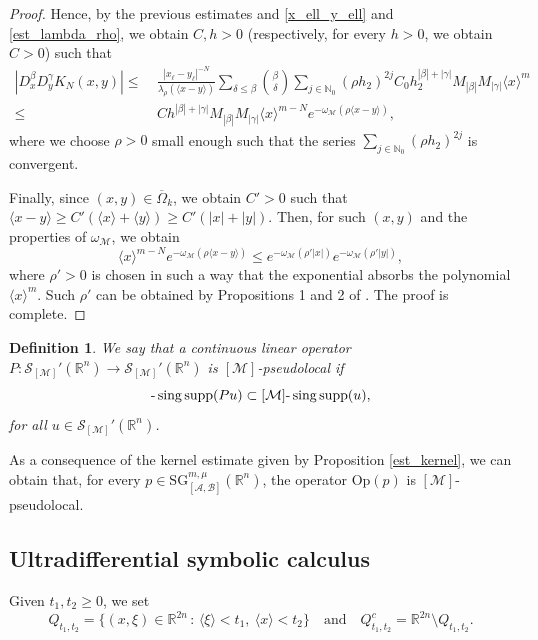 \documentclass[11pt,reqno]{amsart}
\numberwithin{equation}{section}
\newtheorem{definition}[theorem]{Definition}
\newcommand{\R}{{\mathbb{R}}} %
\newcommand{\N}{{\mathbb{N}}} %
\newcommand{\caS}{{\mathcal{S}}}
\newcommand{\SG}{{\mathrm{SG}}}
\newcommand{\M}{{\mathcal{M}}} %
\newcommand{\A}{{\mathcal{A}}} %
\newcommand{\B}{{\mathcal{B}}} %
\begin{document}
\begin{proof}
	Hence, by the previous estimates and \eqref{x_ell_y_ell} and \eqref{est_lambda_rho},  we obtain $C,h>0$ (respectively, for every $h>0$, we obtain $C>0$) such that
	\begin{align*}
		|D_x^\beta D_y^\gamma K_N(x,y)| \leq\ & \frac{|x_\ell-y_\ell|^{-N}}{\lambda_\rho(\langle x-y\rangle)}\sum_{\delta\leq\beta}\binom{\beta}{\delta}\sum_{j\in\N_0}(\rho h_2)^{2j} C_0h_2^{|\beta|+|\gamma|}M_{|\beta|}M_{|\gamma|}\langle x\rangle^{m}\\
		\leq & Ch^{|\beta|+|\gamma|}M_{|\beta|}M_{|\gamma|}\langle x\rangle^{m-N}e^{-\omega_{\M}(\rho\langle x-y\rangle)},
	\end{align*}
	where we choose $\rho>0$ small enough such that the series $\sum_{j\in\N_0}(\rho h_2)^{2j}$ is convergent. 
	
	Finally, since $(x,y)\in\overline{\Omega}_k$, we obtain $C'>0$ such that $\langle x-y\rangle \geq C'(\langle x\rangle+\langle y\rangle) \geq C'(|x|+|y|)$. Then, for such $(x,y)$ and the properties of $\omega_{\M}$, we obtain
	\[\langle x\rangle^{m-N}e^{-\omega_{\M}(\rho\langle x-y\rangle)} \leq e^{-\omega_{\M}(\rho'|x|)}e^{-\omega_{\M}(\rho'|y|)},\]
	where $\rho'>0$ is chosen in such a way that the exponential absorbs the polynomial $\langle x\rangle^{m}$. Such $\rho'$ can be obtained by Propositions 1 and 2 of \cite{KMR_2022}. The proof is complete.	
\end{proof}



\begin{definition}
	We say that a continuous linear operator $P:\caS_{[\M]}'(\R^n)\to \caS_{[\M]}'(\R^n)$ is $[\M]$-pseudolocal if
	\begin{equation*}
		[\M]\text{-\,}\mathrm{sing\,supp} (Pu) \subset [\M]\text{-\,}\mathrm{sing\,supp}(u),
	\end{equation*}
	for all $u\in \caS_{[\M]}'(\R^n)$.
\end{definition}


As a consequence of the kernel estimate given by Proposition \ref{est_kernel}, we can obtain that, for every $p\in {\SG}_{[\A,\B]}^{m,\mu}(\R^n)$, the operator $\mathrm{Op}(p)$ is $[\M]$-pseudolocal.




\subsection{Ultradifferential symbolic calculus}

Given $t_1,t_2\geq 0$, we set
%
\begin{equation*}
	Q_{t_1,t_2}=\{(x,\xi)\in\R^{2n}\,:\, \langle \xi\rangle < t_1,\ \langle x\rangle<t_2\}\quad\text{and}\quad Q_{t_1,t_2}^c = \R^{2n}\setminus Q_{t_1,t_2}.
\end{equation*}
\end{document}
